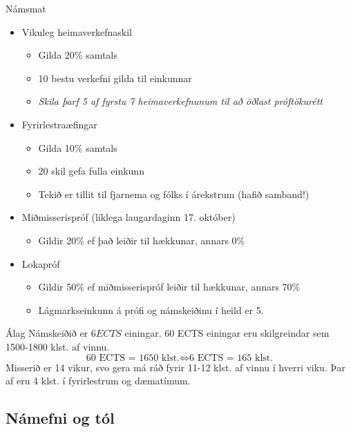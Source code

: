 \documentclass[handout]{beamer}
\begin{document}
\begin{frame}{Námsmat}
\begin{itemize}
 \item Vikuleg heimaverkefnaskil
 \begin{itemize}
  \item Gilda 20\% samtals
  \item 10 bestu verkefni gilda til einkunnar
  \item \emph{Skila þarf 5 af fyrstu 7 heimaverkefnunum til að öðlast próftökurétt}
 \end{itemize}
 \item Fyrirlestraæfingar
 \begin{itemize}
  \item Gilda 10\% samtals
  \item 20 skil gefa fulla einkunn
  \item Tekið er tillit til fjarnema og fólks í árekstrum (hafið samband!)
 \end{itemize}
 \item Miðmisserispróf (líklega laugardaginn 17. október)
 \begin{itemize}
  \item Gildir 20\% ef það leiðir til hækkunar, annars 0\%
 \end{itemize}
 \item Lokapróf
 \begin{itemize}
  \item Gildir 50\% ef miðmisserispróf leiðir til hækkunar, annars 70\%
  \item Lágmarkseinkunn á prófi og námskeiðinu í heild er 5.
 \end{itemize}
\end{itemize}
\end{frame}

\begin{frame}{Álag}
Námskeiðið er $6 ECTS$ einingar. 60 ECTS einingar eru skilgreindar sem 1500-1800 klst. af vinnu.
\[
\text{60 ECTS = 1650 klst.} \Longleftrightarrow \text{6 ECTS = 165 klst.}
\]
Misserið er 14 vikur, svo gera má ráð fyrir 11-12 klst. af vinnu í hverri viku. Þar af eru 4 klst. í fyrirlestrum og dæmatímum.
\end{frame}

\subsection{Námefni og tól}
\end{document}
